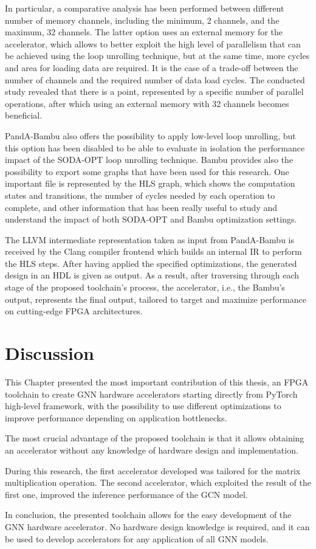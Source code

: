 In particular, a comparative analysis has been performed between different number of memory channels, including the minimum, 2 channels, and the maximum, 32 channels.
The latter option uses an external memory for the accelerator, which allows to better exploit the high level of parallelism that can be achieved using the loop unrolling technique, but at the same time, more cycles and area for loading data are required.
It is the case of a trade-off between the number of channels and the required number of data load cycles.
The conducted study revealed that there is a point, represented by a specific number of parallel operations, after which using an external memory with 32 channels becomes beneficial.

PandA-Bambu also offers the possibility to apply low-level loop unrolling, but this option has been disabled to be able to evaluate in isolation the performance impact of the SODA-OPT loop unrolling technique.
Bambu provides also the possibility to export some graphs that have been used for this research.
One important file is represented by the HLS graph, which shows the computation states and transitions, the number of cycles needed by each operation to complete, and other information that has been really useful to study and understand the impact of both SODA-OPT and Bambu optimization settings.

The LLVM intermediate representation taken as input from PandA-Bambu is received by the Clang compiler frontend which builds an internal IR to perform the HLS steps.
After having applied the specified optimizations, the generated design in an HDL is given as output.
As a result, after traversing through each stage of the proposed toolchain's process, the accelerator, i.e., the Bambu's output, represents the final output, tailored to target and maximize performance on cutting-edge FPGA architectures.

\section{Discussion}
\label{sec:toolchain-discussion}%

This Chapter presented the most important contribution of this thesis, an FPGA toolchain to create GNN hardware accelerators starting directly from PyTorch high-level framework, with the possibility to use different optimizations to improve performance depending on application bottlenecks.

The most crucial advantage of the proposed toolchain is that it allows obtaining an accelerator without any knowledge of hardware design and implementation.

During this research, the first accelerator developed was tailored for the matrix multiplication operation.
The second accelerator, which exploited the result of the first one, improved the inference performance of the GCN model.

In conclusion, the presented toolchain allows for the easy development of the GNN hardware accelerator.
No hardware design knowledge is required, and it can be used to develop accelerators for any application of all GNN models.
